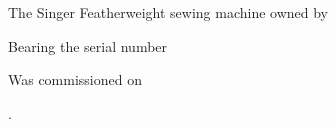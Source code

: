 \documentclass[a4paper]{article}
\begin{document}

\pagecolor{bg}

\begin{center}
\end{center}

\vspace{1cm}

\begin{center}
\end{center}

\vspace{2cm}

\def\setverb{\def\do##1{\catcode`##1=12}\dospecials }
\def\verbinput#1{\bgroup \setverb \unskip\egroup}

\begin{center}

The Singer Featherweight sewing machine owned by

\vspace{0.3cm}%
{\Large \verbinput{name.txt}}%
\vspace{1cm}

Bearing the serial number

\vspace{0.3cm}%
{\Large \verbinput{serial.txt}}%
\vspace{1cm}

Was commissioned on

\vspace{0.3cm}%
{\Large \verbinput{date.txt}}.%
\vspace{1cm}

\end{center}
\end{document}

